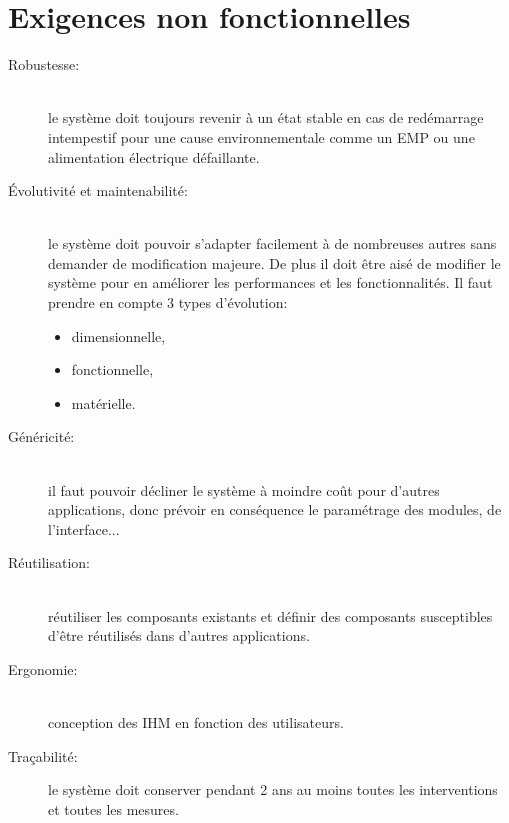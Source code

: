 \section{Exigences non fonctionnelles}
    \begin{description}
        \item[Robustesse:]\hfill\\
            le système doit toujours revenir à un état
            stable en cas de redémarrage intempestif pour une cause
            environnementale comme un EMP ou une alimentation électrique
            défaillante.
    
        \item[Évolutivité et maintenabilité:]\hfill\\
            le système doit pouvoir
            s'adapter facilement à de nombreuses autres sans demander de
            modification majeure.
            De plus il doit être aisé de modifier le système pour en
            améliorer les performances et les fonctionnalités.
            Il faut prendre en compte 3 types d'évolution:
            \begin{itemize}
                \item dimensionnelle,
                \item fonctionnelle,
                \item matérielle.
            \end{itemize}

        \item[Généricité:]\hfill\\
            il faut pouvoir décliner le système à moindre
            coût pour d'autres applications, donc prévoir en conséquence
            le paramétrage des modules, de l'interface...

        \item[Réutilisation:]\hfill\\
            réutiliser les composants existants et
            définir des composants susceptibles d'être réutilisés dans
            d'autres applications.

        \item[Ergonomie:]\hfill\\
            conception des IHM en fonction des
            utilisateurs.

        \item[Traçabilité:] le système doit conserver pendant 2 ans au
            moins toutes les interventions et toutes les mesures.
    \end{description}

